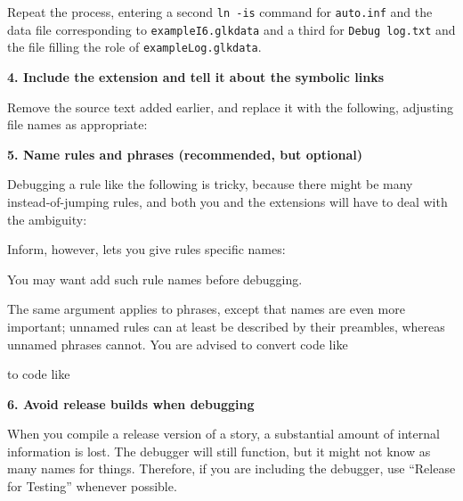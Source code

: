 \documentclass{book}
\newcommand{\lastpagebreak}{\vfill\pagebreak}
\begin{document}
Repeat the process, entering a second \texttt{ln -is} command for
\texttt{auto.inf} and the data file corresponding to \texttt{exampleI6.glkdata}
and a third for \texttt{Debug log.txt} and the file filling the role of
\texttt{exampleLog.glkdata}.

\lastpagebreak

\textbf{4. Include the extension and tell it about the symbolic links}

Remove the source text added earlier, and replace it with the following,
adjusting file names as appropriate:

\begin{quote}
  
\end{quote}

\textbf{5. Name rules and phrases (recommended, but optional)}

Debugging a rule like the following is tricky, because there might be many
instead-of-jumping rules, and both you and the extensions will have to deal with
the ambiguity:

\begin{quote}
  
\end{quote}

Inform, however, lets you give rules specific names:

\begin{quote}
  
\end{quote}

You may want add such rule names before debugging.

The same argument applies to phrases, except that names are even more important;
unnamed rules can at least be described by their preambles, whereas unnamed
phrases cannot.  You are advised to convert code like

\begin{quote}
  
\end{quote}

to code like

\begin{quote}
  
\end{quote}

\textbf{6. Avoid release builds when debugging}

When you compile a release version of a story, a substantial amount of internal
information is lost.  The debugger will still function, but it might not know as
many names for things.  Therefore, if you are including the debugger, use
``Release for Testing'' whenever possible.
\end{document}

